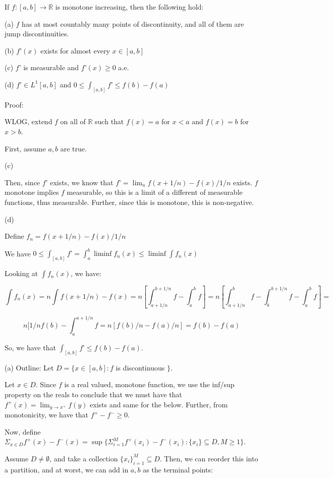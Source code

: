 \documentclass[10pt]{article}
\begin{document}
If $f: [a,b] \to \mathbb{R}$ is monotone increasing, then the following hold:

(a) $f$ has at most countably many points of discontinuity, and all of them are jump discontinuities.

(b) $f’(x)$ exists for almost every $x \in [a,b]$

(c) $f’$ is measurable and $f’(x) \geq 0$ a.e.

(d) $f’ \in L^1[a,b]$ and $0 \leq \int_{[a,b]} f’ \leq f(b) - f(a)$

Proof:

WLOG, extend $f$ on all of $\mathbb{R}$ such that $f(x) = a$ for $x < a$ and $f(x) = b$ for $x > b$.

First, assume $a,b$ are true.

(c)

Then, since $f’$ exists, we know that $f’ = \lim_n f(x+1/n) - f(x)/ 1/n$ exists. $f$ monotone implies $f$ measurable, so this is a limit of a different of measurable functions, thus measurable. Further, since this is monotone, this is non-negative.

(d)

Define $f_n =  f(x+1/n) - f(x)/ 1/n$

We have $0 \leq \int_{[a,b]} f’ = \int_a^b \liminf f_n(x) \leq \liminf \int f_n(x)$

Looking at $\int f_n(x)$, we have:

$$\int f_n(x) = n \int f(x + 1/n) - f(x) = n [\int_{a + 1/n}^{b + 1/n} f - \int_a^b f] = n[\int_{a + 1/n}^b f - \int_b^{b + 1/n} f - \int_a^b f] = $$

$$ n [ 1/n f(b) - \int_a^{a + 1/n} f  = n [f(b)/n - f(a)/n] = f(b) - f(a) $$

So, we have that $\int_{[a,b]} f’  \leq f(b) - f(a)$.

(a) Outline: Let $D = \{ x \in [a,b] : f$ is discontinuous $\}$.

Let $x \in D$. Since $f$ is a real valued, monotone function, we use the inf/sup property on the reals to conclude that we must have that $f^+(x) = \lim_{y \to x^+} f(y)$ exists and same for the below. Further, from monotonicity, we have that $f^+ - f^- \geq 0$.

Now, define $\Sigma_{x\in D} f^+(x) - f^-(x)  = \sup\{ \Sigma_{i=1}^M f^+(x_i) - f^-(x_i) : \{ x_i \} \subseteq D, M \geq 1 \}$.

Assume $D \not = \emptyset$, and take a collection $\{ x_i \}_{i=1}^M \subseteq D$. Then, we can reorder this into a partition, and at worst, we can add in $a,b$ as the terminal points:
\end{document}
